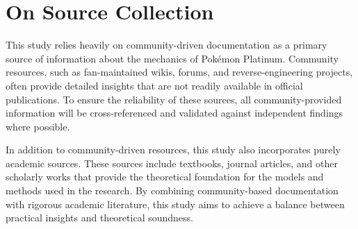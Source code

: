 \section{On Source Collection}

This study relies heavily on community-driven documentation as a primary source of information about the mechanics of Pokémon Platinum. Community resources, such as fan-maintained wikis, forums, and reverse-engineering projects, often provide detailed insights that are not readily available in official publications. To ensure the reliability of these sources, all community-provided information will be cross-referenced and validated against independent findings where possible.

In addition to community-driven resources, this study also incorporates purely academic sources. These sources include textbooks, journal articles, and other scholarly works that provide the theoretical foundation for the models and methods used in the research. By combining community-based documentation with rigorous academic literature, this study aims to achieve a balance between practical insights and theoretical soundness.